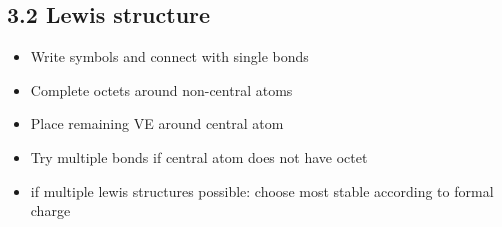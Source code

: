 \subsection{3.2 Lewis structure}
    \begin{itemize}
        \itemsep0em
        \item Write symbols and connect with single bonds
        \item Complete octets around non-central atoms
        \item Place remaining VE around central atom
        \item Try multiple bonds if central atom does not have octet
        \item if multiple lewis structures possible: choose most stable according to formal charge
    \end{itemize}